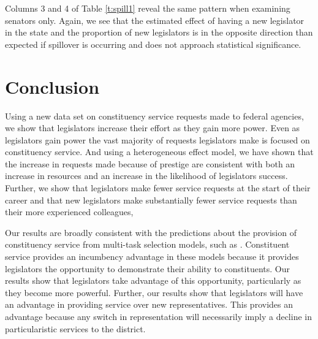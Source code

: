 \documentclass{article}
\begin{document}
\begin{table}[hbt!]
\caption{Little Evidence of Spillovers from New Legislators} \label{t:spill1}

\begin{minipage}{\textwidth}
\begin{center}

\end{center}
\end{minipage}
\end{table}

Columns 3 and 4 of Table \ref{t:spill1} reveal the same pattern when examining senators only.  Again, we see that the estimated effect of having a new legislator in the state and the proportion of new legislators is in the opposite direction than expected if spillover is occurring and does not approach statistical significance.  

\section{Conclusion} \label{s:conclude}

Using a new data set on constituency service requests made to federal agencies, we show that legislators increase their effort as they gain more power.  Even as legislators gain power the vast majority of requests legislators make is focused on constituency service.  And using a heterogeneous effect model, we have shown that the increase in requests made because of prestige are consistent with both an increase in resources and an increase in the likelihood of legislators success. Further, we show that legislators make fewer service requests at the start of their career and that new legislators make substantially fewer service requests than their more experienced colleagues,  

Our results are broadly consistent with the predictions about the provision of constituency service from multi-task selection models, such as \cite{AshworthBuenodeMesquita2006}.  Constituent service provides an incumbency advantage in these models because it provides legislators the opportunity to demonstrate their ability to constituents.  Our results show that legislators take advantage of this opportunity, particularly as they become more powerful.  Further, our results show that legislators will have an advantage in providing service over new representatives.  This provides an advantage because any switch in representation will necessarily imply a decline in particularistic services to the district. 
\end{document}
